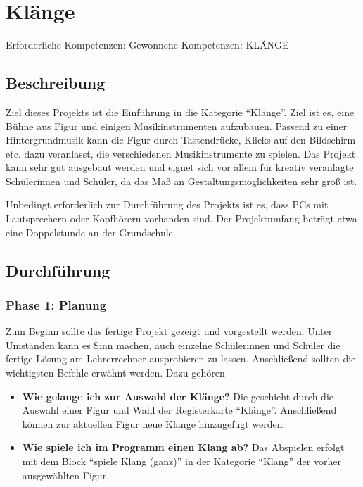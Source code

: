 \section{Klänge}\label{kluxe4nge}

Erforderliche Kompetenzen: Gewonnene Kompetenzen: KLÄNGE

\begin{figure}[ht]
    \centering 
    \caption[\Sectionname]{\Sectionname}
\end{figure}

\subsection{Beschreibung}\label{beschreibung}

Ziel dieses Projekts ist die Einführung in die Kategorie ``Klänge''.
Ziel ist es, eine Bühne aus Figur und einigen Musikinstrumenten
aufzubauen. Passend zu einer Hintergrundmusik kann die Figur durch
Tastendrücke, Klicks auf den Bildschirm etc. dazu veranlasst, die
verschiedenen Musikinstrumente zu spielen. Das Projekt kann sehr gut
ausgebaut werden und eignet sich vor allem für kreativ veranlagte
Schülerinnen und Schüler, da das Maß an Gestaltungsmöglichkeiten sehr
groß ist.

Unbedingt erforderlich zur Durchführung des Projekts ist es, dass PCs
mit Lautsprechern oder Kopfhörern vorhanden sind. Der Projektumfang
beträgt etwa eine Doppelstunde an der Grundschule.

\subsection{Durchführung}\label{durchfuxfchrung}

\subsubsection{Phase 1: Planung}\label{phase-1-planung}

Zum Beginn sollte das fertige Projekt gezeigt und vorgestellt werden.
Unter Umständen kann es Sinn machen, auch einzelne Schülerinnen und
Schüler die fertige Lösung am Lehrerrechner ausprobieren zu lassen.
Anschließend sollten die wichtigsten Befehle erwähnt werden. Dazu
gehören

\begin{itemize}
\item
  \textbf{Wie gelange ich zur Auswahl der Klänge?} Die geschieht durch
  die Auswahl einer Figur und Wahl der Registerkarte ``Klänge''.
  Anschließend können zur aktuellen Figur neue Klänge hinzugefügt
  werden.
\item
  \textbf{Wie spiele ich im Programm einen Klang ab?} Das Abspielen
  erfolgt mit dem Block ``spiele Klang (ganz)'' in der Kategorie
  ``Klang'' der vorher ausgewählten Figur.
\end{itemize}

